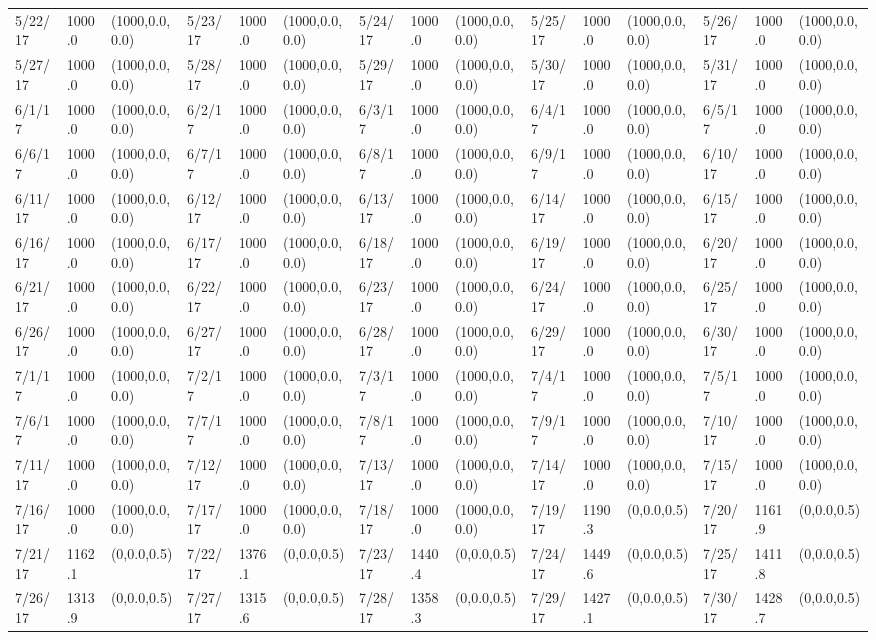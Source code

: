\documentclass[12pt]{article}
\begin{document}
\begin{table}
\begin{center}
\begin{tabular}{p{15pt}p{15pt}p{25pt}p{15pt}p{15pt}p{25pt}p{15pt}p{15pt}p{25pt}p{15pt}p{15pt}p{25pt}p{15pt}p{15pt}p{25pt}}
    5/22/17&1000.0&(1000,0.0,0.0)&5/23/17&1000.0&(1000,0.0,0.0)&5/24/17&1000.0&(1000,0.0,0.0)&5/25/17&1000.0&(1000,0.0,0.0)&5/26/17&1000.0&(1000,0.0,0.0)\\
    5/27/17&1000.0&(1000,0.0,0.0)&5/28/17&1000.0&(1000,0.0,0.0)&5/29/17&1000.0&(1000,0.0,0.0)&5/30/17&1000.0&(1000,0.0,0.0)&5/31/17&1000.0&(1000,0.0,0.0)\\
    6/1/17&1000.0&(1000,0.0,0.0)&6/2/17&1000.0&(1000,0.0,0.0)&6/3/17&1000.0&(1000,0.0,0.0)&6/4/17&1000.0&(1000,0.0,0.0)&6/5/17&1000.0&(1000,0.0,0.0)\\
    6/6/17&1000.0&(1000,0.0,0.0)&6/7/17&1000.0&(1000,0.0,0.0)&6/8/17&1000.0&(1000,0.0,0.0)&6/9/17&1000.0&(1000,0.0,0.0)&6/10/17&1000.0&(1000,0.0,0.0)\\
    6/11/17&1000.0&(1000,0.0,0.0)&6/12/17&1000.0&(1000,0.0,0.0)&6/13/17&1000.0&(1000,0.0,0.0)&6/14/17&1000.0&(1000,0.0,0.0)&6/15/17&1000.0&(1000,0.0,0.0)\\
    6/16/17&1000.0&(1000,0.0,0.0)&6/17/17&1000.0&(1000,0.0,0.0)&6/18/17&1000.0&(1000,0.0,0.0)&6/19/17&1000.0&(1000,0.0,0.0)&6/20/17&1000.0&(1000,0.0,0.0)\\
    6/21/17&1000.0&(1000,0.0,0.0)&6/22/17&1000.0&(1000,0.0,0.0)&6/23/17&1000.0&(1000,0.0,0.0)&6/24/17&1000.0&(1000,0.0,0.0)&6/25/17&1000.0&(1000,0.0,0.0)\\
    6/26/17&1000.0&(1000,0.0,0.0)&6/27/17&1000.0&(1000,0.0,0.0)&6/28/17&1000.0&(1000,0.0,0.0)&6/29/17&1000.0&(1000,0.0,0.0)&6/30/17&1000.0&(1000,0.0,0.0)\\
    7/1/17&1000.0&(1000,0.0,0.0)&7/2/17&1000.0&(1000,0.0,0.0)&7/3/17&1000.0&(1000,0.0,0.0)&7/4/17&1000.0&(1000,0.0,0.0)&7/5/17&1000.0&(1000,0.0,0.0)\\
    7/6/17&1000.0&(1000,0.0,0.0)&7/7/17&1000.0&(1000,0.0,0.0)&7/8/17&1000.0&(1000,0.0,0.0)&7/9/17&1000.0&(1000,0.0,0.0)&7/10/17&1000.0&(1000,0.0,0.0)\\
    7/11/17&1000.0&(1000,0.0,0.0)&7/12/17&1000.0&(1000,0.0,0.0)&7/13/17&1000.0&(1000,0.0,0.0)&7/14/17&1000.0&(1000,0.0,0.0)&7/15/17&1000.0&(1000,0.0,0.0)\\
    7/16/17&1000.0&(1000,0.0,0.0)&7/17/17&1000.0&(1000,0.0,0.0)&7/18/17&1000.0&(1000,0.0,0.0)&7/19/17&1190.3&(0,0.0,0.5)&7/20/17&1161.9&(0,0.0,0.5)\\
    7/21/17&1162.1&(0,0.0,0.5)&7/22/17&1376.1&(0,0.0,0.5)&7/23/17&1440.4&(0,0.0,0.5)&7/24/17&1449.6&(0,0.0,0.5)&7/25/17&1411.8&(0,0.0,0.5)\\
    7/26/17&1313.9&(0,0.0,0.5)&7/27/17&1315.6&(0,0.0,0.5)&7/28/17&1358.3&(0,0.0,0.5)&7/29/17&1427.1&(0,0.0,0.5)&7/30/17&1428.7&(0,0.0,0.5)\\

\end{tabular}
\end{center}
\end{table}
\end{document}
